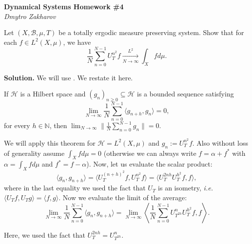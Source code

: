 \documentclass{template}
\begin{document}
\begin{center}
    \Large \textcolor{blue!70!black}{\textbf{Dynamical Systems Homework \#4}} \\
    \normalsize \textit{Dmytro Zakharov}
\end{center}

\begin{problem}[Exercise 1]
    Let $(X,\mathcal{B},\mu,T)$ be a totally ergodic measure preserving system.
    Show that for each $f \in L^2(X,\mu)$, we have 
    \begin{equation*}
        \frac{1}{N}\sum_{n=0}^{N-1}U_T^{n^2}f \xrightarrow[N \to \infty]{L^2} \int_X fd\mu.
    \end{equation*}
\end{problem}

\textbf{Solution.} We will use \cite[Theorem 1.4]{Bergelson_1987}. We restate it here.
\begin{theorem}
    If $\mathcal{H}$ is a Hilbert space and $(g_n)_{n \geq 0} \subseteq \mathcal{H}$
    is a bounded sequence satisfying
    \begin{equation*}
        \lim_{N \to \infty} \frac{1}{N}\sum_{n=0}^{N-1} \langle g_{n+h}, g_n\rangle = 0,
    \end{equation*} 
    for every $h \in \mathbb{N}$, then $\lim_{N \to \infty}\|\frac{1}{N}\sum_{n=0}^{N-1}g_n \| = 0$.
\end{theorem}

We will apply this theorem for $\mathcal{H}=L^2(X,\mu)$ and $g_n := U_T^{n^2}f$.
Also without loss of generality assume $\int_X fd\mu=0$ (otherwise we can always
write $f=\alpha+f^*$ with $\alpha=\int_X fd\mu$ and $f^* = f
- \alpha$). Now, let us evaluate the scalar product:
\begin{equation*}
    \langle g_n, g_{n+h} \rangle = \langle U_T^{(n+h)^2}f, U_T^{n^2}f \rangle = \langle U_T^{2nh}U_T^{h^2}f, f \rangle,
\end{equation*}
where in the last equality we used the fact that $U_T$ is an isometry,
\textit{i.e.} $\langle U_Tf, U_Tg \rangle = \langle f, g \rangle$.
Now we evaluate the limit of the average:
\begin{equation*}
    \lim_{N \to \infty}\frac{1}{N}\sum_{n=0}^{N-1}\langle g_n, g_{n+h} \rangle = \lim_{N \to \infty}\left\langle \frac{1}{N}\sum_{n=0}^{N-1}U_{T^{2h}}^nU_T^{h^2}f,f \right\rangle.
\end{equation*}

Here, we used the fact that $U_{T}^{2nh} = U_{T^{2h}}^n$.
\end{document}
